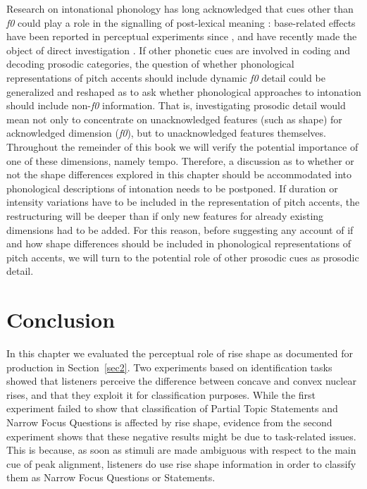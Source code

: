 Research on intonational phonology has long acknowledged that cues other than \textit{f0} could play a role in the signalling of post-lexical meaning \citep{hirschberg1992influence}: base-related effects have been reported in perceptual experiments since \citet{dimperio2000role}, and have recently made the object of direct investigation \citep{niebuhr2010pitchaccent}. If other phonetic cues are involved in coding and decoding prosodic categories, the question of whether phonological representations of pitch accents should include dynamic \textit{f0} detail could be generalized and reshaped as to ask whether phonological approaches to intonation should include non-\textit{f0} information. That is, investigating prosodic detail would mean not only to concentrate on unacknowledged features (such as shape) for acknowledged dimension (\textit{f0}), but to unacknowledged features themselves. 
Throughout the remeinder of this book we will verify the potential importance of one of these dimensions, namely tempo. Therefore, a discussion as to whether or not the shape differences explored in this chapter should be accommodated into phonological descriptions of intonation needs to be postponed. If duration or intensity variations have to be included in the representation of pitch accents, the restructuring will be deeper than if only new features for already existing dimensions had to be added. For this reason, before suggesting any account of if and how shape differences should be included in phonological representations of pitch accents, we will turn to the potential role of other prosodic cues as prosodic detail.

\section{Conclusion}\label{sec35}
In this chapter we evaluated the perceptual role of rise shape as documented for production in Section~\ref{sec2}. Two experiments based on identification tasks showed that listeners perceive the difference between concave and convex nuclear rises, and that they exploit it for classification purposes. While the first experiment failed to show that classification of Partial Topic Statements and Narrow Focus Questions is affected by rise shape, evidence from the second experiment shows that these negative results might be due to task-related issues. This is because, as soon as stimuli are made ambiguous with respect to the main cue of peak alignment, listeners do use rise shape information in order to classify them as Narrow Focus Questions or Statements. 

